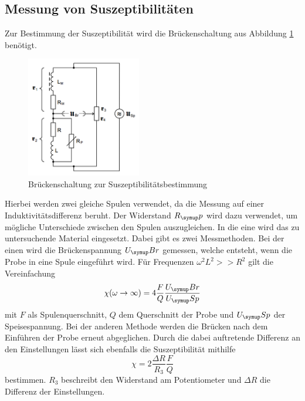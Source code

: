 \subsection{Messung von Suszeptibilitäten}
Zur Bestimmung der Suszeptibilität wird die Brückenschaltung aus Abbildung
\ref{fig:schaltung} benötigt.
\begin{figure}
  \centering
  \includegraphics[width=5cm]{bilder/schaltung.png}
  \caption{Brückenschaltung zur Suszeptibilitätsbestimmung \cite{606}}
  \label{fig:schaltung}
\end{figure}
Hierbei werden zwei gleiche Spulen verwendet, da die Messung auf einer
Induktivitätsdifferenz beruht. Der Widerstand $R_\su{p}$ wird dazu verwendet,
um mögliche Unterschiede zwischen den Spulen auszugleichen. In die eine wird das
zu untersuchende
Material eingesetzt. Dabei gibt es zwei Messmethoden. Bei der einen wird die
Brückenspannung $U_\su{Br}$ gemessen, welche entsteht, wenn die Probe in eine
Spule eingeführt wird. Für Frequenzen $\omega^2L^2 >>R^2$ gilt die Vereinfachung
\begin{equation}
 \chi (\omega \to \infty) = 4 \frac{F}{Q}\frac{U_\su{Br}}{U_\su{Sp}}
\end{equation}
mit $F$ als Spulenquerschnitt, $Q$ dem Querschnitt der Probe und $U_\su{Sp}$ der
Speisespannung.
Bei der anderen Methode werden die Brücken nach dem Einführen der Probe erneut
abgeglichen. Durch die dabei auftretende Differenz an den Einstellungen
lässt sich ebenfalls die Suszeptibilität mithilfe
\begin{equation}
 \chi = 2\frac{\Delta R}{R_3}\frac{F}{Q}
\end{equation}
bestimmen. $R_3$ beschreibt den Widerstand am Potentiometer und $\Delta R$ die
Differenz der Einstellungen.

